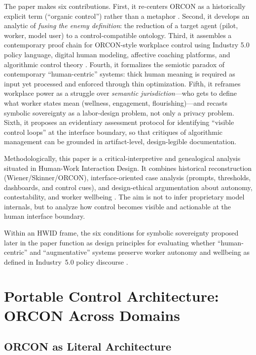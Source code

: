 \documentclass[runningheads]{llncs}
\begin{document}
The paper makes six contributions. First, it re-centers ORCON as a historically explicit term (``organic control'') rather than a metaphor \cite{skinner1960pigeons}. Second, it develops an analytic of \emph{fusing the enemy definition}: the reduction of a target agent (pilot, worker, model user) to a control-compatible ontology. Third, it assembles a contemporary proof chain for ORCON-style workplace control using Industry 5.0 policy language, digital human modeling, affective coaching platforms, and algorithmic control theory \cite{breque2021industry,siemensPSXHuman,siemensHumanAdvanced,cxtoday2022cogito,kellogg2020algorithms}. Fourth, it formalizes the semiotic paradox of contemporary ``human-centric'' systems: thick human meaning is required as input yet processed and enforced through thin optimization. Fifth, it reframes workplace power as a struggle over \emph{semantic jurisdiction}---who gets to define what worker states mean (wellness, engagement, flourishing)---and recasts symbolic sovereignty as a labor-design problem, not only a privacy problem. Sixth, it proposes an evidentiary assessment protocol for identifying ``visible control loops'' at the interface boundary, so that critiques of algorithmic management can be grounded in artifact-level, design-legible documentation.

Methodologically, this paper is a critical-interpretive and genealogical analysis situated in Human-Work Interaction Design. It combines historical reconstruction (Wiener/Skinner/ORCON), interface-oriented case analysis (prompts, thresholds, dashboards, and control cues), and design-ethical argumentation about autonomy, contestability, and worker wellbeing \cite{geertz1973interpretation,kellogg2020algorithms,disalvo2012adversarial}. The aim is not to infer proprietary model internals, but to analyze how control becomes visible and actionable at the human interface boundary.

Within an HWID frame, the six conditions for symbolic sovereignty proposed later in the paper function as design principles for evaluating whether ``human-centric'' and ``augmentative'' systems preserve worker autonomy and wellbeing as defined in Industry~5.0 policy discourse \cite{breque2021industry,hwid2026cfp}.

\section{Portable Control Architecture: ORCON Across Domains}

\subsection{ORCON as Literal Architecture}
\end{document}
